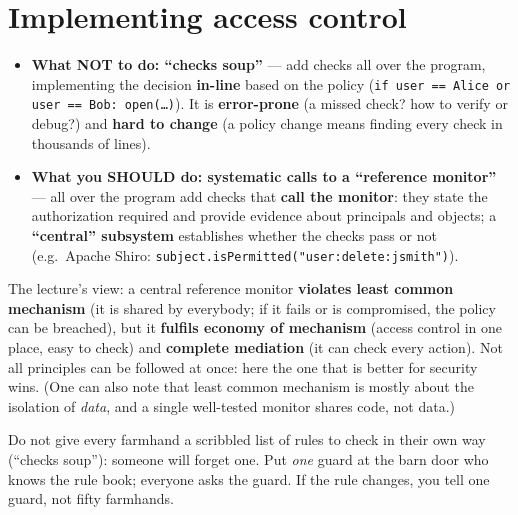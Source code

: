 \section{Implementing access control}

\begin{propbox}[title={``Checks soup'' vs.\ reference monitor}]
\begin{itemize}
  \item \textbf{What NOT to do: ``checks soup''} --- add checks all over the program,
        implementing the decision \textbf{in-line} based on the policy
        (\texttt{if user == Alice or user == Bob: open(\ldots)}). It is \textbf{error-prone}
        (a missed check? how to verify or debug?) and \textbf{hard to change} (a policy change
        means finding every check in thousands of lines).
  \item \textbf{What you SHOULD do: systematic calls to a ``reference monitor''} ---
        all over the program add checks that \textbf{call the monitor}: they state the
        authorization required and provide evidence about principals and objects; a
        \textbf{``central'' subsystem} establishes whether the checks pass or not
        (e.g.\ Apache Shiro: \texttt{subject.isPermitted("user:delete:jsmith")}).
\end{itemize}
\end{propbox}

\begin{rembox}[title=Least common mechanism? A tradeoff between principles]
The lecture's view: a central reference monitor \textbf{violates least common mechanism} (it is
shared by everybody; if it fails or is compromised, the policy can be breached), but it
\textbf{fulfils economy of mechanism} (access control in one place, easy to check) and
\textbf{complete mediation} (it can check every action). Not all principles can be followed at
once: here the one that is better for security wins. (One can also note that least common
mechanism is mostly about the isolation of \emph{data}, and a single well-tested monitor shares
code, not data.)
\end{rembox}

\begin{goatbox}
Do not give every farmhand a scribbled list of rules to check in their own way (``checks soup''):
someone will forget one. Put \emph{one} guard at the barn door who knows the rule book; everyone
asks the guard. If the rule changes, you tell one guard, not fifty farmhands.
\end{goatbox}

